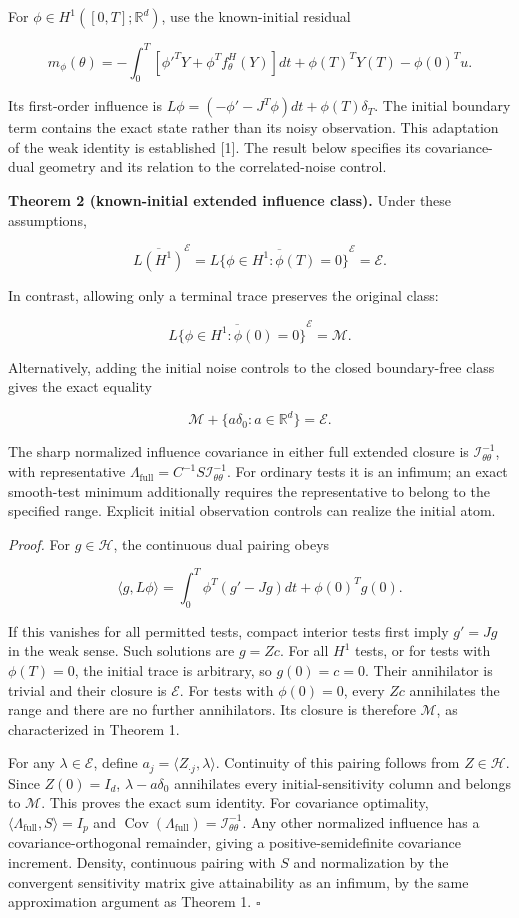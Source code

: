\documentclass[
  american,
  11pt,
]{article}
\begin{document}
For \(\phi\in H^1([0,T];\mathbb R^d)\), use the known-initial residual

\[
m_\phi(\theta)=-\int_0^T[\phi'^TY+\phi^Tf_\theta^H(Y)]dt
+\phi(T)^TY(T)-\phi(0)^Tu.
\]

Its first-order influence is
\(L\phi=(-\phi'-J^T\phi)dt+\phi(T)\delta_T\). The initial boundary term
contains the exact state rather than its noisy observation. This
adaptation of the weak identity is established {[}1{]}. The result below
specifies its covariance-dual geometry and its relation to the
correlated-noise control.

\textbf{Theorem 2 (known-initial extended influence class).} Under these
assumptions,

\[
\overline{L(H^1)}^{\mathcal E}
=\overline{L\{\phi\in H^1:\phi(T)=0\}}^{\mathcal E}
=\mathcal E.
\]

In contrast, allowing only a terminal trace preserves the original
class:

\[
\overline{L\{\phi\in H^1:\phi(0)=0\}}^{\mathcal E}=\mathcal M.
\]

Alternatively, adding the initial noise controls to the closed
boundary-free class gives the exact equality

\[
\mathcal M+\{a\delta_0:a\in\mathbb R^d\}=\mathcal E.
\]

The sharp normalized influence covariance in either full extended
closure is \(\mathcal I_{\theta\theta}^{-1}\), with representative
\(\Lambda_{\mathrm{full}}=C^{-1}S\mathcal I_{\theta\theta}^{-1}\). For
ordinary tests it is an infimum; an exact smooth-test minimum
additionally requires the representative to belong to the specified
range. Explicit initial observation controls can realize the initial
atom.

\emph{Proof.} For \(g\in\mathcal H\), the continuous dual pairing obeys

\[
\langle g,L\phi\rangle
=\int_0^T\phi^T(g'-Jg)dt+\phi(0)^Tg(0).
\]

If this vanishes for all permitted tests, compact interior tests first
imply \(g'=Jg\) in the weak sense. Such solutions are \(g=Zc\). For all
\(H^1\) tests, or for tests with \(\phi(T)=0\), the initial trace is
arbitrary, so \(g(0)=c=0\). Their annihilator is trivial and their
closure is \(\mathcal E\). For tests with \(\phi(0)=0\), every \(Zc\)
annihilates the range and there are no further annihilators. Its closure
is therefore \(\mathcal M\), as characterized in Theorem 1.

For any \(\lambda\in\mathcal E\), define
\(a_j=\langle Z_{\cdot j},\lambda\rangle\). Continuity of this pairing
follows from \(Z\in\mathcal H\). Since \(Z(0)=I_d\),
\(\lambda-a\delta_0\) annihilates every initial-sensitivity column and
belongs to \(\mathcal M\). This proves the exact sum identity. For
covariance optimality, \(\langle\Lambda_{\mathrm{full}},S\rangle=I_p\)
and
\(\operatorname{Cov}(\Lambda_{\mathrm{full}})=\mathcal I_{\theta\theta}^{-1}\).
Any other normalized influence has a covariance-orthogonal remainder,
giving a positive-semidefinite covariance increment. Density, continuous
pairing with \(S\) and normalization by the convergent sensitivity
matrix give attainability as an infimum, by the same approximation
argument as Theorem 1. \(\square\)
\end{document}
